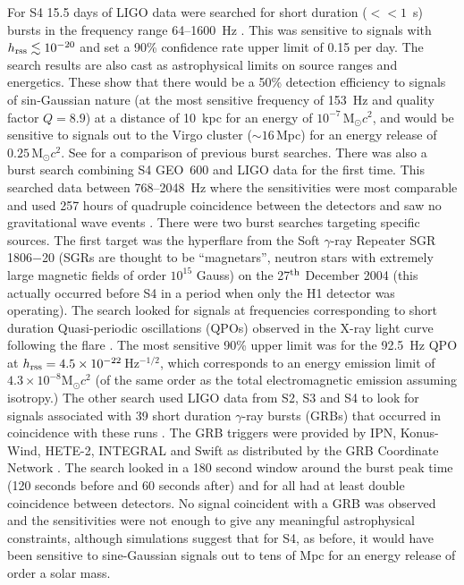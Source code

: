 \documentclass{article}
\begin{document}
For S4 15.5 days of LIGO data were searched for short duration ($<< 1$~s) bursts
in the frequency range 64--1600~Hz \cite{Abbott:2007b}. This was sensitive to
signals with $h_{\rm rss}\lesssim10^{-20}$ and set a 90\% confidence rate
upper limit of 0.15 per day. The search results are also cast as astrophysical
limits on source ranges and energetics. These show that there would be a 50\%
detection efficiency to signals of sin-Gaussian nature (at the most sensitive frequency of
153~Hz and quality factor $Q=8.9$) at a distance of 10~kpc for an energy of
$10^{-7}$\,M$_{\odot}c^2$, and would be sensitive to signals out to the Virgo
cluster ($\sim16$\,Mpc) for an energy release of $0.25$\,M$_{\odot}c^2$. See 
\cite{Abbott:2007b} for a comparison of previous burst searches. There was
also a burst search combining S4 GEO~600 and LIGO data for the first time. This
searched data between 768--2048~Hz where the sensitivities were most comparable
and used 257 hours of quadruple coincidence between the detectors and saw no
gravitational wave events \cite{Abbott:2008b}. There were two burst searches
targeting specific sources. The first target was the hyperflare from the Soft
$\gamma$-ray Repeater SGR 1806$-$20 (SGRs are thought to be ``magnetars'',
neutron stars with extremely large magnetic fields of order $10^{15}$ Gauss) on
the 27$^{\rm th}$ December 2004 \cite{Hurley:2005} (this actually occurred before
S4 in a period when only the H1 detector was operating). The search looked for
signals at frequencies corresponding to short duration Quasi-periodic
oscillations (QPOs) observed in the X-ray light curve following the flare
\cite{Abbott:2007c}. The most sensitive 90\% upper limit was for the 92.5~Hz QPO
at $h_{\rm rss} = 4.5\times10^{-22}$\,Hz$^{-1/2}$, which corresponds to an
energy emission limit of $4.3\times10^{-8}$M$_{\odot}c^2$ (of the same order as
the total electromagnetic emission assuming isotropy.) The other search used
LIGO data from S2, S3 and S4 to look for signals associated with 39 short
duration $\gamma$-ray bursts (GRBs) that occurred in coincidence with these runs
\cite{Abbott:2008c}. The GRB triggers were provided by IPN, Konus-Wind, HETE-2,
INTEGRAL and Swift as distributed by the GRB Coordinate Network \cite{GCN}. The
search looked in a 180 second window around the burst peak time (120 seconds
before and 60 seconds after) and for all had at least double coincidence
between detectors. No signal coincident with a GRB was observed and the
sensitivities were not enough to give any meaningful astrophysical constraints,
although simulations suggest that for S4, as before, it would have been
sensitive to sine-Gaussian signals out to tens of Mpc for an energy release of
order a solar mass.
\end{document}
